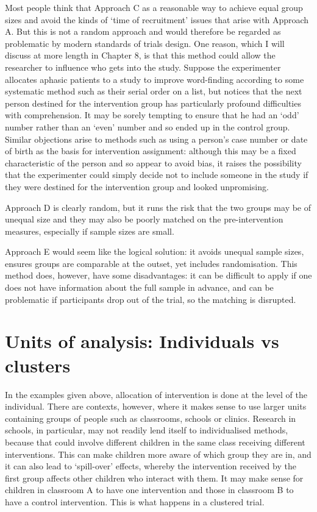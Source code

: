 \documentclass[]{book}
\begin{document}
Most people think that Approach C as a reasonable way to achieve equal group sizes and avoid the kinds of `time of recruitment' issues that arise with Approach A. But this is not a random approach and would therefore be regarded as problematic by modern standards of trials design. One reason, which I will discuss at more length in Chapter 8, is that this method could allow the researcher to influence who gets into the study. Suppose the experimenter allocates aphasic patients to a study to improve word-finding according to some systematic method such as their serial order on a list, but notices that the next person destined for the intervention group has particularly profound difficulties with comprehension. It may be sorely tempting to ensure that he had an `odd' number rather than an `even' number and so ended up in the control group. Similar objections arise to methods such as using a person's case number or date of birth as the basis for intervention assignment: although this may be a fixed characteristic of the person and so appear to avoid bias, it raises the possibility that the experimenter could simply decide not to include someone in the study if they were destined for the intervention group and looked unpromising.

Approach D is clearly random, but it runs the risk that the two groups may be of unequal size and they may also be poorly matched on the pre-intervention measures, especially if sample sizes are small.

Approach E would seem like the logical solution: it avoids unequal sample sizes, ensures groups are comparable at the outset, yet includes randomisation. This method does, however, have some disadvantages: it can be difficult to apply if one does not have information about the full sample in advance, and can be problematic if participants drop out of the trial, so the matching is disrupted.

\hypertarget{units-of-analysis-individuals-vs-clusters}{%
\section{Units of analysis: Individuals vs clusters}\label{units-of-analysis-individuals-vs-clusters}}

In the examples given above, allocation of intervention is done at the level of the individual. There are contexts, however, where it makes sense to use larger units containing groups of people such as classrooms, schools or clinics. Research in schools, in particular, may not readily lend itself to individualised methods, because that could involve different children in the same class receiving different interventions. This can make children more aware of which group they are in, and it can also lead to `spill-over' effects, whereby the intervention received by the first group affects other children who interact with them. It may make sense for children in classroom A to have one intervention and those in classroom B to have a control intervention. This is what happens in a clustered trial.
\end{document}
